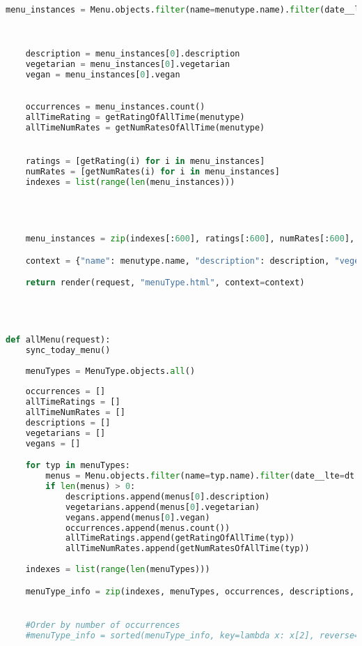 \begin{lstlisting}[language=Python]
    menu_instances = Menu.objects.filter(name=menutype.name).filter(date__lte=dt.date.today()).order_by("-date")
    


    description = menu_instances[0].description
    vegetarian = menu_instances[0].vegetarian
    vegan = menu_instances[0].vegan

    
    occurrences = menu_instances.count()
    allTimeRating = getRatingOfAllTime(menutype)
    allTimeNumRates = getNumRatesOfAllTime(menutype)


    ratings = [getRating(i) for i in menu_instances]
    numRates = [getNumRates(i) for i in menu_instances]
    indexes = list(range(len(menu_instances)))




    menu_instances = zip(indexes[:600], ratings[:600], numRates[:600], menu_instances[:600])

    context = {"name": menutype.name, "description": description, "vegetarian": vegetarian, "vegan": vegan, "menu_instances": menu_instances, "occurrences": occurrences, "allTimeRating": allTimeRating, "allTimeNumRates": allTimeNumRates}

    return render(request, "menuType.html", context=context)




def allMenu(request):
    sync_today_menu()
    
    menuTypes = MenuType.objects.all()
    
    occurrences = []
    allTimeRatings = []
    allTimeNumRates = []
    descriptions = []
    vegetarians = []
    vegans = []

    for typ in menuTypes:
        menus = Menu.objects.filter(name=typ.name).filter(date__lte=dt.date.today())
        if len(menus) > 0:
            descriptions.append(menus[0].description)
            vegetarians.append(menus[0].vegetarian)
            vegans.append(menus[0].vegan)
            occurrences.append(menus.count())
            allTimeRatings.append(getRatingOfAllTime(typ))
            allTimeNumRates.append(getNumRatesOfAllTime(typ))
        
    indexes = list(range(len(menuTypes))) 

    menuType_info = zip(indexes, menuTypes, occurrences, descriptions, vegetarians, vegans, allTimeRatings, allTimeNumRates)


    #Order by number of occurrences
    #menuType_info = sorted(menuType_info, key=lambda x: x[2], reverse=True)  # Sort the menu info after occurrences -> lowest to highest


\end{lstlisting}
